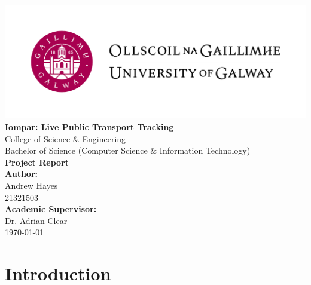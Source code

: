\documentclass[a4paper,11pt]{report}
\author{Andrew Hayes}
\begin{document}
\begin{titlepage}
    \begin{center}

        \vfill
        \includegraphics[width=\textwidth]{./images/Logo-UGalway-2-3166136658.jpg} \\[1cm]

        {\Huge \textbf{Iompar: Live Public Transport Tracking}} \\[0.5cm]
        
        {\Large College of Science \& Engineering} \\[0.3cm]
        {\large Bachelor of Science (Computer Science \& Information Technology)} \\[0.5cm]

        {\large \textbf{Project Report}} \\[1.5cm]

        {\Large \textbf{Author:}} \\[0.2cm]
        {\large Andrew Hayes \\ 21321503 } \\[1cm]

        {\Large \textbf{Academic Supervisor:}} \\[0.2cm]
        {\large Dr. Adrian Clear} \\[1.5cm]

        {\Large \today}
        \vfill
    \end{center}
\end{titlepage}

\newpage
\tableofcontents
\newpage
\setcounter{page}{1}


\chapter{Introduction}
\end{document}
